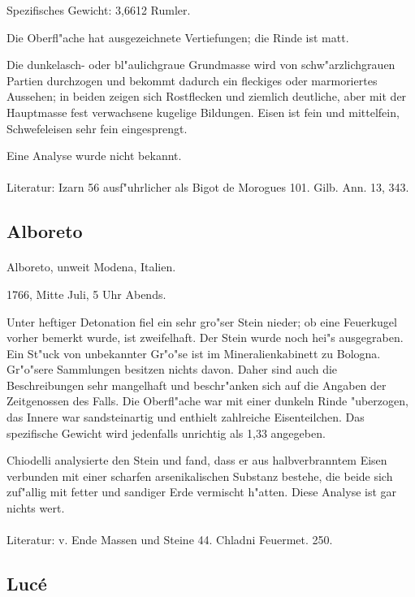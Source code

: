 \documentclass[a4paper, 11pt, oneside]{article}
\begin{document}
Spezifisches Gewicht: 3,6612 Rumler.

Die Oberfl"ache hat ausgezeichnete Vertiefungen; die Rinde ist matt.

Die dunkelasch- oder bl"aulichgraue Grundmasse wird von schw"arzlichgrauen Partien durchzogen und bekommt dadurch ein fleckiges oder marmoriertes Aussehen; in beiden zeigen sich Rostflecken und ziemlich deutliche, aber mit der Hauptmasse fest verwachsene kugelige Bildungen. Eisen ist fein und mittelfein, Schwefeleisen sehr fein eingesprengt.

Eine Analyse wurde nicht bekannt.
\footnotesize
\paragraph{}
Literatur: Izarn 56 ausf"uhrlicher als Bigot de Morogues 101. Gilb. Ann. 13, 343.
\subsection{Alboreto}
\normalsize
\paragraph{}
Alboreto, unweit Modena, Italien.

1766, Mitte Juli, 5 Uhr Abends.

Unter heftiger Detonation fiel ein sehr gro"ser Stein nieder; ob eine Feuerkugel vorher bemerkt wurde, ist zweifelhaft. Der Stein wurde noch hei"s ausgegraben. Ein St"uck von unbekannter Gr"o"se ist im Mineralienkabinett zu Bologna. Gr"o"sere Sammlungen besitzen nichts davon. Daher sind auch die Beschreibungen sehr mangelhaft und beschr"anken sich auf die Angaben der Zeitgenossen des Falls. Die Oberfl"ache war mit einer dunkeln Rinde "uberzogen, das Innere war sandsteinartig und enthielt zahlreiche Eisenteilchen. Das spezifische Gewicht wird jedenfalls unrichtig als 1,33 angegeben.

Chiodelli analysierte den Stein und fand, dass er aus halbverbranntem Eisen verbunden mit einer scharfen arsenikalischen Substanz bestehe, die beide sich zuf"allig mit fetter und sandiger Erde vermischt h"atten. Diese Analyse ist gar nichts wert.
\footnotesize
\paragraph{}
Literatur: v. Ende Massen und Steine 44. Chladni Feuermet. 250.
\subsection{Lucé}
\normalsize
\end{document}
